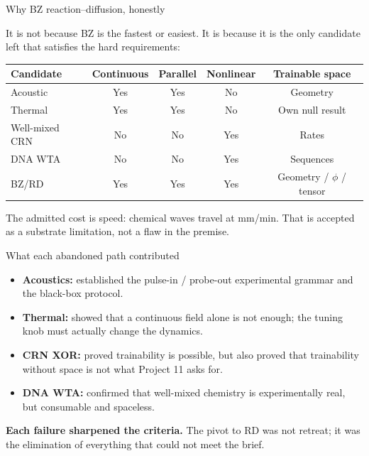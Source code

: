 \documentclass[aspectratio=169,11pt]{beamer}
\begin{document}
\begin{frame}{Why BZ reaction--diffusion, honestly}

It is not because BZ is the fastest or easiest. It is because it is the only candidate left that satisfies the hard requirements:

\vspace{0.3cm}
\begin{table}
\centering
\footnotesize
\begin{tabular}{lcccc}
\toprule
\textbf{Candidate} & \textbf{Continuous} & \textbf{Parallel} & \textbf{Nonlinear} & \textbf{Trainable space} \\
\midrule
Acoustic & Yes & Yes & No & Geometry \\
Thermal & Yes & Yes & No & Own null result \\
Well-mixed CRN & No & No & Yes & Rates \\
DNA WTA & No & No & Yes & Sequences \\
BZ/RD & Yes & Yes & Yes & Geometry / $\phi$ / tensor \\
\bottomrule
\end{tabular}
\end{table}

\vspace{0.3cm}
The admitted cost is speed: chemical waves travel at mm/min. That is accepted as a substrate limitation, not a flaw in the premise.

\end{frame}

\begin{frame}{What each abandoned path contributed}

\begin{itemize}
    \item \textbf{Acoustics:} established the pulse-in / probe-out experimental grammar and the black-box protocol.
    \item \textbf{Thermal:} showed that a continuous field alone is not enough; the tuning knob must actually change the dynamics.
    \item \textbf{CRN XOR:} proved trainability is possible, but also proved that trainability without space is not what Project 11 asks for.
    \item \textbf{DNA WTA:} confirmed that well-mixed chemistry is experimentally real, but consumable and spaceless.
\end{itemize}

\vspace{0.3cm}
\textbf{Each failure sharpened the criteria.} The pivot to RD was not retreat; it was the elimination of everything that could not meet the brief.

\end{frame}
\end{document}
